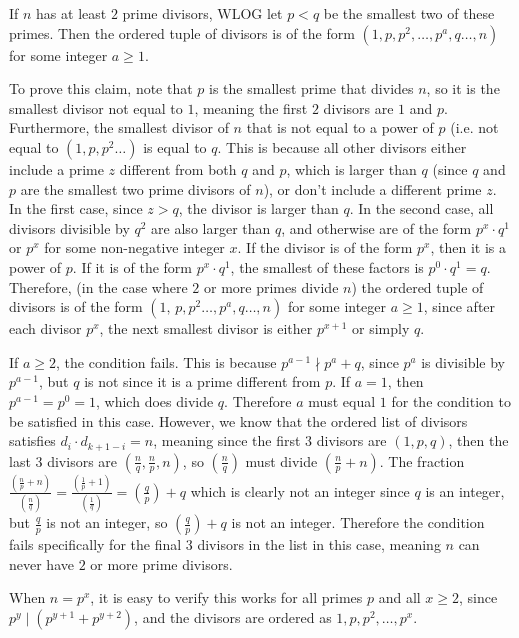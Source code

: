 \begin{solution}
If $n$ has at least $2$ prime divisors, WLOG let $p<q$ be the smallest two of these primes. Then the ordered tuple of divisors is of the form $(1,p,p^2,\dots,p^a,q\dots,n)$ for some integer $a\ge 1$.

To prove this claim, note that $p$ is the smallest prime that divides $n$, so it is the smallest divisor not equal to $1$, meaning the first $2$ divisors are $1$ and $p$. Furthermore, the smallest divisor of $n$ that is not equal to a power of $p$ (i.e. not equal to $(1,p,p^2\dots)$ is equal to $q$. This is because all other divisors either include a prime $z$ different from both $q$ and $p$, which is larger than $q$ (since $q$ and $p$ are the smallest two prime divisors of $n$), or don’t include a different prime $z$. In the first case, since $z>q$, the divisor is larger than $q$. In the second case, all divisors divisible by $q^2$ are also larger than $q$, and otherwise are of the form $p^x \cdot q^1$ or $p^x$ for some non-negative integer $x$. If the divisor is of the form $p^x$, then it is a power of $p$. If it is of the form $p^x \cdot q^1$, the smallest of these factors is $p^0 \cdot q^1 = q$. Therefore, (in the case where $2$ or more primes divide $n$) the ordered tuple of divisors is of the form $(1,\,  p,p^2 \dots,p^a,q \dots,n)$ for some integer $a\geq 1$, since after each divisor $p^x$, the next smallest divisor is either $p^{x+1}$ or simply $q$.

If $a\geq 2$, the condition fails. This is because $p^{a-1} \nmid p^a + q$, since $p^a$ is divisible by $p^{a-1}$, but $q$ is not since it is a prime different from $p$. If $a=1$, then $p^{a-1}=p^0=1$, which does divide $q$. Therefore $a$ must equal $1$ for the condition to be satisfied in this case. However, we know that the ordered list of divisors satisfies $d_i \cdot d_{k+1-i}=n$, meaning since the first $3$ divisors are $(1, p, q)$, then the last $3$ divisors are $(\frac{n}{q}, \frac{n}{p}, n)$, so $(\frac{n}{q})$ must divide $(\frac{n}{p} + n)$. The fraction $\frac{(\frac{n}{p} + n)}{(\frac{n}{q})} = \frac{(\frac{1}{p} + 1)}{(\frac{1}{q})} = (\frac{q}{p}) + q$ which is clearly not an integer since $q$ is an integer, but $\frac{q}{p}$ is not an integer, so $(\frac{q}{p}) + q$ is not an integer. Therefore the condition fails specifically for the final $3$ divisors in the list in this case, meaning $n$ can never have $2$ or more prime divisors.

When $n=p^x$, it is easy to verify this works for all primes $p$ and all $x\ge 2$, since $p^y \mid (p^{y+1} + p^{y+2})$, and the divisors are ordered as $1, p, p^2, \dots, p^x$.
\end{solution}

